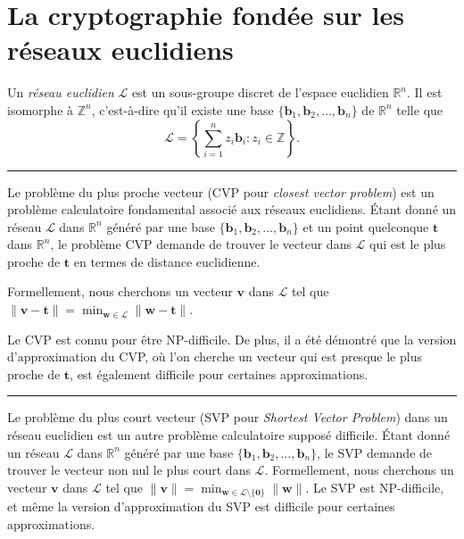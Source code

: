 
\section{La cryptographie fondée sur les réseaux euclidiens} %
\label{sec:reseaux}



Un \emph{réseau euclidien} $\mathcal{L}$ est un sous-groupe discret de l’espace euclidien $\mathbb{R}^n$. Il est isomorphe à $\mathbb{Z}^n$, c'est-à-dire qu’il existe une base $\{\mathbf{b}_1, \mathbf{b}_2, \ldots, \mathbf{b}_n\}$ de $\mathbb{R}^n$ telle que
\[
\mathcal{L} = \left\{ \sum_{i=1}^n z_i \mathbf{b}_i : z_i \in \mathbb{Z} \right\}.
\]
\vskip1cm
\hrule
\vskip1cm
Le problème du plus proche vecteur (CVP pour \emph{closest vector problem}) est un problème calculatoire fondamental associé aux réseaux euclidiens. Étant donné un réseau $\mathcal{L}$ dans $\mathbb{R}^n$ généré par une base $\{\mathbf{b}_1, \mathbf{b}_2, \ldots, \mathbf{b}_n\}$ et un point quelconque $\mathbf{t}$ dans $\mathbb{R}^n$, le problème CVP demande de trouver le vecteur dans $\mathcal{L}$ qui est le plus proche de $\mathbf{t}$ en termes de distance euclidienne.

Formellement, nous cherchons un vecteur $\mathbf{v}$ dans $\mathcal{L}$ tel que $\|\mathbf{v}-\mathbf{t}\| = \min_{\mathbf{w} \in \mathcal{L}} \|\mathbf{w}-\mathbf{t}\|$.

Le CVP est connu pour être NP-difficile. De plus, il a été démontré que la version d'approximation du CVP, où l'on cherche un vecteur qui est presque le plus proche de $\mathbf{t}$, est également difficile pour certaines approximations. 

\vskip1cm
\hrule
\vskip1cm


Le problème du plus court vecteur (SVP pour \emph{Shortest Vector Problem}) dans un réseau euclidien est un autre problème calculatoire supposé difficile. Étant donné un réseau $\mathcal{L}$ dans $\mathbb{R}^n$ généré par une base $\{\mathbf{b}_1, \mathbf{b}_2, \ldots, \mathbf{b}_n\}$, le SVP demande de trouver le vecteur non nul le plus court dans $\mathcal{L}$. Formellement, nous cherchons un vecteur $\mathbf{v}$ dans $\mathcal{L}$ tel que $\|\mathbf{v}\| = \min_{\mathbf{w} \in \mathcal{L} \setminus \{ \mathbf{0} \}} \|\mathbf{w}\|$. Le SVP est NP-difficile, et même la version d'approximation du SVP est difficile pour certaines approximations.

